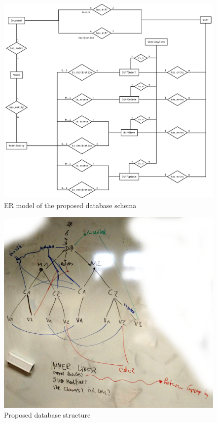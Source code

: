 \begin{figure}
	\centering
	\includegraphics[width=\textwidth]{resources/db-concept-er.pdf}
	\caption{ER model of the proposed database schema}
	\label{fig:db-er-model}
\end{figure}

\begin{figure}[h]
	\includegraphics[width=\textwidth]{resources/db_structure.jpg}
	\caption{Proposed database structure}
	\label{fig:db-model}
\end{figure}

